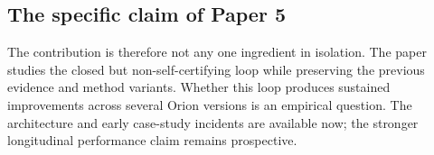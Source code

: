 \subsection{The specific claim of Paper 5}

The contribution is therefore not any one ingredient in isolation. The paper studies the closed but non-self-certifying loop
while preserving the previous evidence and method variants. Whether this loop produces sustained improvements across several Orion versions is an empirical question. The architecture and early case-study incidents are available now; the stronger longitudinal performance claim remains prospective.
